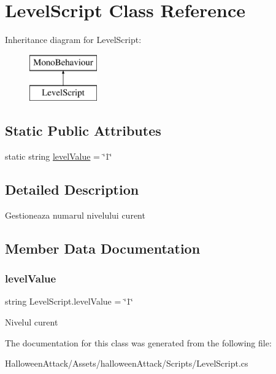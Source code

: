 \hypertarget{class_level_script}{}\section{Level\+Script Class Reference}
\label{class_level_script}
Inheritance diagram for Level\+Script\+:\begin{figure}[H]
\begin{center}
\leavevmode
\includegraphics[height=2.000000cm]{class_level_script}
\end{center}
\end{figure}
\subsection*{Static Public Attributes}
\begin{DoxyCompactItemize}
\item 
static string \hyperlink{class_level_script_abb5aff606d2a904687daa65de8807278}{level\+Value} = \char`\"{}1\char`\"{}
\end{DoxyCompactItemize}


\subsection{Detailed Description}
Gestioneaza numarul nivelului curent 

\subsection{Member Data Documentation}
\mbox{\label{class_level_script_abb5aff606d2a904687daa65de8807278}} 
\subsubsection{\texorpdfstring{level\+Value}{levelValue}}
{\footnotesize\ttfamily string Level\+Script.\+level\+Value = \char`\"{}1\char`\"{}\hspace{0.3cm}{\ttfamily [static]}}

Nivelul curent 

The documentation for this class was generated from the following file\+:\begin{DoxyCompactItemize}
\item 
Halloween\+Attack/\+Assets/halloween\+Attack/\+Scripts/Level\+Script.\+cs\end{DoxyCompactItemize}
